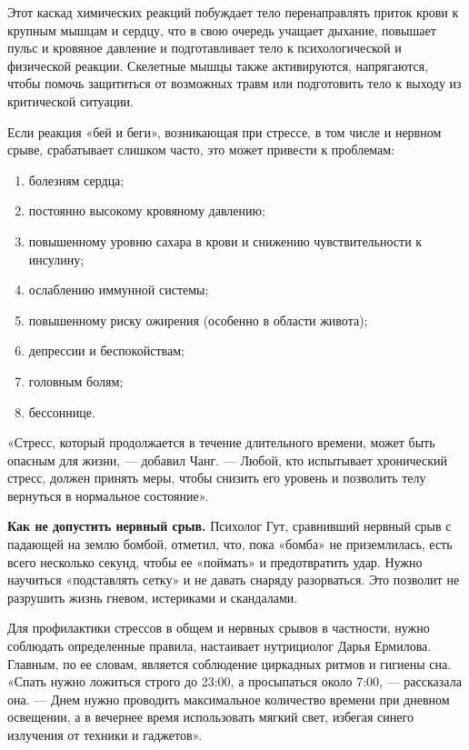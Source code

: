 Этот каскад химических реакций побуждает тело перенаправлять приток крови к крупным мышцам и сердцу, что в свою очередь учащает дыхание, повышает пульс и кровяное давление и подготавливает тело к психологической и физической реакции. Скелетные мышцы также активируются, напрягаются, чтобы помочь защититься от возможных травм или подготовить тело к выходу из критической ситуации.

Если реакция «бей и беги», возникающая при стрессе, в том числе и нервном срыве, срабатывает слишком часто, это может привести к проблемам:

\begin{enumerate}
    \item болезням сердца;
    \item постоянно высокому кровяному давлению;
    \item повышенному уровню сахара в крови и снижению чувствительности к инсулину;
    \item ослаблению иммунной системы;
    \item повышенному риску ожирения (особенно в области живота);
    \item депрессии и беспокойствам;
    \item головным болям;
    \item бессоннице.
\end{enumerate}

«Стресс, который продолжается в течение длительного времени, может быть опасным для жизни,  ---  добавил Чанг.  ---  Любой, кто испытывает хронический стресс, должен принять меры, чтобы снизить его уровень и позволить телу вернуться в нормальное состояние».

\textbf{Как не допустить нервный срыв.}
Психолог Гут, сравнивший нервный срыв с падающей на землю бомбой, отметил, что, пока «бомба» не приземлилась, есть всего несколько секунд, чтобы ее «поймать» и предотвратить удар. Нужно научиться «подставлять сетку» и не давать снаряду разорваться. Это позволит не разрушить жизнь гневом, истериками и скандалами.

Для профилактики стрессов в общем и нервных срывов в частности, нужно соблюдать определенные правила, настаивает нутрициолог Дарья Ермилова. Главным, по ее словам, является соблюдение циркадных ритмов и гигиены сна. «Спать нужно ложиться строго до 23:00, а просыпаться около 7:00,  ---  рассказала она.  ---  Днем нужно проводить максимальное количество времени при дневном освещении, а в вечернее время использовать мягкий свет, избегая синего излучения от техники и гаджетов».

